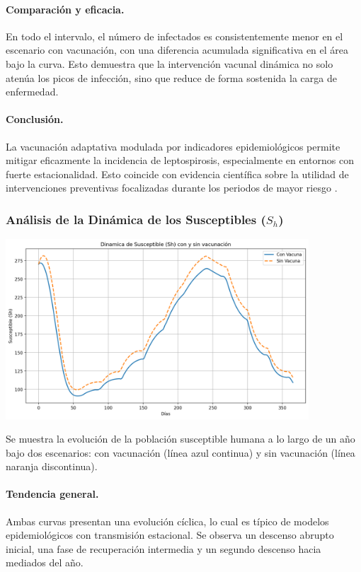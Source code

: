 \documentclass[12pt,a4paper]{article}
\begin{document}
\paragraph{Comparación y eficacia.} En todo el intervalo, el número de infectados es consistentemente menor en el escenario con vacunación, con una diferencia acumulada significativa en el área bajo la curva. Esto demuestra que la intervención vacunal dinámica no solo atenúa los picos de infección, sino que reduce de forma sostenida la carga de enfermedad.

\paragraph{Conclusión.} La vacunación adaptativa modulada por indicadores epidemiológicos permite mitigar eficazmente la incidencia de leptospirosis, especialmente en entornos con fuerte estacionalidad. Esto coincide con evidencia científica sobre la utilidad de intervenciones preventivas focalizadas durante los periodos de mayor riesgo \cite{pijnacker2019}.




\subsubsection{Análisis de la Dinámica de los Susceptibles (\texorpdfstring{$S_h$}{Sh})}

\includegraphics[width=0.85\textwidth]{Images/susceptibles.png}

Se muestra la evolución de la población susceptible humana a lo largo de un año bajo dos escenarios: con vacunación (línea azul continua) y sin vacunación (línea naranja discontinua). 


\paragraph{Tendencia general.} Ambas curvas presentan una evolución cíclica, lo cual es típico de modelos epidemiológicos con transmisión estacional. Se observa un descenso abrupto inicial, una fase de recuperación intermedia y un segundo descenso hacia mediados del año.
\end{document}
